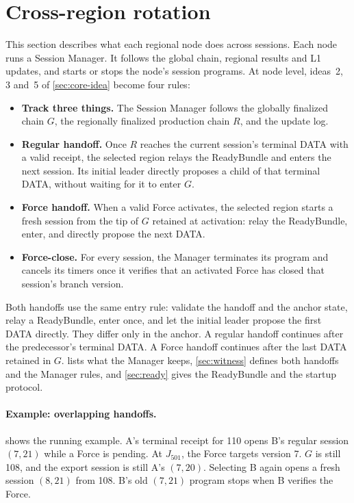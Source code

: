 \documentclass[11pt,a4paper]{article}
\newcounter{protocol}
\begin{document}
\section{Cross-region rotation}
\label{sec:xprotocols}
This section describes what each regional node does across sessions.
Each node runs a Session Manager. It follows the global chain, regional
results and L1 updates, and starts or stops the node's session programs.
At node level, ideas~2, 3 and~5 of
\cref{sec:core-idea} become four rules:
\begin{itemize}[itemsep=2pt]
\item \textbf{Track three things.} The Session Manager follows the
globally finalized chain $G$, the regionally finalized production chain
$R$, and the update log.
\item \textbf{Regular handoff.} Once $R$ reaches the current session's
terminal DATA with a valid receipt, the selected region relays the
ReadyBundle and enters the next session. Its initial leader directly
proposes a child of that terminal DATA, without waiting for it to enter $G$.
\item \textbf{Force handoff.} When a valid Force activates, the selected
region starts a fresh session from the tip of $G$ retained at activation:
relay the ReadyBundle, enter, and directly propose the next DATA.
\item \textbf{Force-close.} For every session, the Manager terminates its
program and cancels its timers once it verifies that an activated Force
has closed that session's branch version.
\end{itemize}
Both handoffs use the same entry rule: validate the handoff and the
anchor state, relay a ReadyBundle, enter once, and let the initial leader
propose the first DATA directly. They differ only in the anchor. A
regular handoff continues after the predecessor's terminal DATA. A Force
handoff continues after the last DATA retained in $G$.
 lists what the Manager keeps,
\cref{sec:witness} defines both handoffs and the Manager rules, and
\cref{sec:ready} gives the ReadyBundle and the startup protocol.

\paragraph{Example: overlapping handoffs.}
 shows the running example. A's terminal
receipt for 110 opens B's regular session $(7,21)$ while a Force is
pending. At $J_{501}$, the Force targets version 7. $G$ is still 108, and
the export session is still A's $(7,20)$. Selecting B again opens a fresh
session $(8,21)$ from 108. B's old $(7,21)$ program stops when B
verifies the Force.
\end{document}
